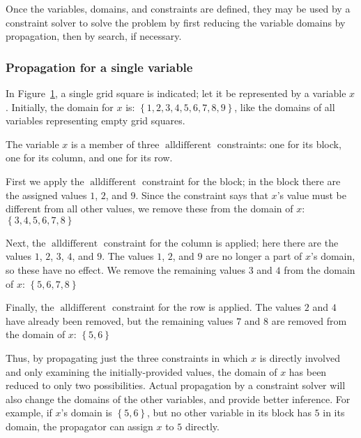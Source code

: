 \documentclass[a4paper,10pt,twoside,openright]{book}
\newcommand{\set}[1]{\left\{#1\right\}}
\DeclareMathOperator{\alldifferent}{alldifferent}
\begin{document}
Once the variables, domains, and constraints are defined, they may be used by a constraint solver to solve the problem by first reducing the variable domains by propagation, then by search, if necessary.

\subsubsection{Propagation for a single variable}
\begin{figure}
    \centering
    
    \label{fig:sudokusquare}
\end{figure}

In Figure~\ref{fig:sudokusquare}, a single grid square is indicated; let it be represented
by a variable $x$. 
Initially,
the domain for $x$ is: $\set{1,2,3,4,5,6,7,8,9}$,
like the domains of all variables representing empty grid squares.

The variable $x$ is a member of three $\alldifferent$ constraints: one for its block, one for its column, and one for its row.

First we apply the $\alldifferent$ constraint for the block; in the block there are the assigned values $1$, $2$, and $9$. Since the constraint says that $x$'s value must be different from all other values, we remove these from the domain of $x$: $\set{3,4,5,6,7,8}$

Next, the $\alldifferent$ constraint for the column is applied; here there are the values $1$, $2$, $3$, $4$, and $9$. The values $1$, $2$, and $9$ are no longer a part of $x$'s domain, so these have no effect. We remove the remaining values $3$ and $4$ from the domain of $x$: $\set{5,6,7,8}$

Finally, the $\alldifferent$ constraint for the row is applied. The values $2$ and $4$ have already been removed, but the remaining values $7$ and $8$ are removed from the domain of $x$: $\set{5,6}$

Thus, by propagating just the three constraints in which $x$ is directly involved and only examining the initially-provided values, the domain of $x$ has been reduced to only two possibilities. Actual propagation by a constraint solver will also change the domains of the other variables, and provide better inference. For example, if $x$'s domain is $\set{5,6}$, but no other variable in its block has $5$ in its domain, the propagator can assign $x$ to $5$ directly.  
\end{document}
